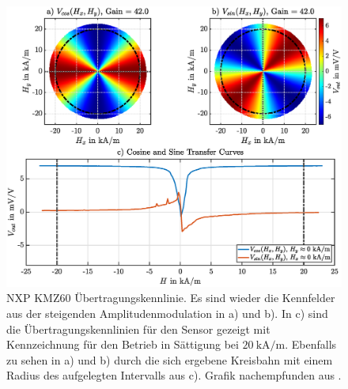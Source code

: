 \begin{figure}[tbph]
	\centering
	\includegraphics[width=\linewidth]{appendix/images/4-KMZ60/KMZ60_Uebertragungskennlinien}
	\caption[NXP KMZ60 Übertragungskennlinie]{NXP KMZ60 Übertragungskennlinie. Es sind wieder die Kennfelder aus 
		der steigenden Amplitudenmodulation in a) und b). In c) sind die Übertragungskennlinien für den Sensor gezeigt 
		mit Kennzeichnung für den Betrieb in Sättigung bei $\SI{20}{\kilo\ampere\per\metre}$. Ebenfalls zu sehen in a) 
		und b) durch die sich ergebene Kreisbahn mit einem Radius des aufgelegten Intervalls aus c). Grafik 
		nachempfunden aus \cite{Schuethe2019}.}
	\label{fig:kmz60uebertragungskennlinien}
\end{figure}
